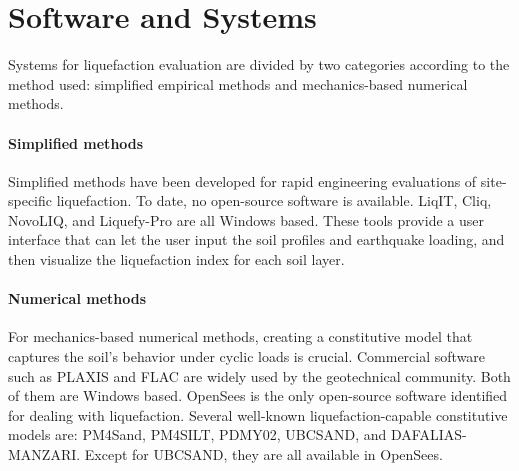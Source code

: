 \section{Software and Systems}
\label{sec:eq_liq_tools}

Systems for liquefaction evaluation are divided by two categories according to the method used: simplified empirical methods and mechanics-based numerical methods.

\paragraph{Simplified methods}
Simplified methods have been developed for rapid engineering evaluations of site-specific liquefaction. To date, no open-source software is available. LiqIT, Cliq, NovoLIQ, and Liquefy-Pro are all Windows based. These tools provide a user interface that can let the user input the soil profiles and earthquake loading, and then visualize the liquefaction index for each soil layer.

\paragraph{Numerical methods}
For mechanics-based numerical methods, creating a constitutive model that captures the soil's behavior under cyclic loads is crucial. Commercial software such as PLAXIS and FLAC are widely used by the geotechnical community. Both of them are Windows based. OpenSees is the only open-source software identified for dealing with liquefaction. Several well-known liquefaction-capable constitutive models are: PM4Sand, PM4SILT, PDMY02, UBCSAND, and DAFALIAS-MANZARI. Except for UBCSAND, they are all available in OpenSees.
